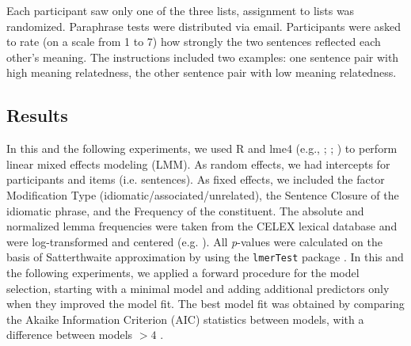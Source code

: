 \documentclass[output=paper]{langsci/langscibook}
\begin{document}
Each participant saw only one of the three lists, assignment to lists was randomized. Paraphrase tests were distributed via email. Participants were asked to rate (on a scale from 1 to 7) how strongly the two sentences reflected each other’s meaning. The instructions included two examples: one sentence pair with high meaning relatedness, the other sentence pair with low meaning relatedness. 

\subsection{Results}

In this and the following experiments, we used R \citep{rCore:2012} and lme4 (e.g., \citealt{bates:2005}; \citealt{bates:2012}; \citealt{baayen:2008}) to perform linear mixed effects modeling (LMM). As random effects, we had intercepts for participants and items (i.e. sentences). As fixed effects, we included the factor Modification Type (idiomatic/associated/unrelated), the Sentence Closure of the idiomatic phrase, and the Frequency of the constituent. The absolute and normalized lemma frequencies were taken from the CELEX lexical database \citep{baayen:1993} and were log-transformed and centered (e.g. \citealt{winter:2013}). All \textit{p}-values were calculated on the basis of Satterthwaite approximation by using the \texttt{lmerTest} package \citep{kuznetsova:2015}. In this and the following experiments, we applied a forward procedure for the model selection, starting with a minimal model and adding additional predictors only when they improved the model fit. The best model fit was obtained by comparing the Akaike Information Criterion (AIC) statistics between models, with a difference between models $>4$ \citep{sakamoto:1986}. 

\begin{table}
\caption{Fixed effects of the predictors in the linear mixed-effect model for the paraphrase ratings in Experiment 1. \textit{Notes:} significance code: *** < 0.0001.\label{tab:linear}}
\end{table}
\end{document}
